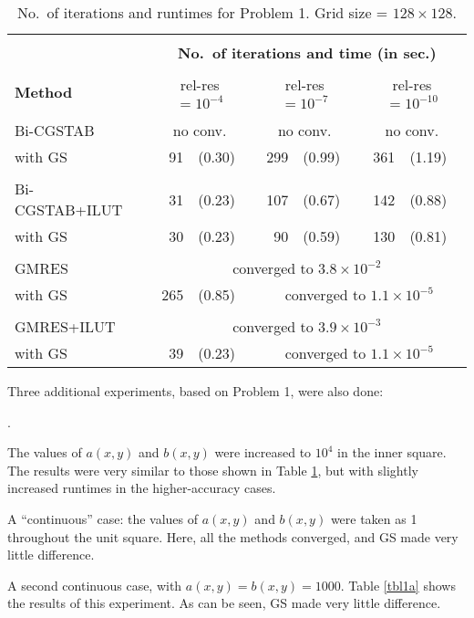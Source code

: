 \documentclass[12pt,a4paper]{article}
\newcounter{i}
\newenvironment{enumerat}
{
\setcounter{i}{0}
\begin{list}
{\arabic{i}.}
{
\usecounter{i}
\setlength{\leftmargin}{25pt}
\setlength{\parsep}{0pt}
\setlength{\itemsep}{0pt}
\setlength{\topsep}{\parskip}
\setlength{\parskip}{0pt}
\setlength{\baselineskip}{14pt}
\setlength{\labelsep}{5pt}
\setlength{\itemindent}{0pt}
}
}
{\end{list}}
\def\be{\begin{enumerat}}
\def\ee{\end{enumerat}}
\def\time{\!\times\!}
\def\noconv{\multicolumn{2}{|c|}{no conv.}}
\begin{document}
\begin{table}[!h]
\def\noconv{\multicolumn{2}{|c|}{no conv.}}
\centering
\begin{tabular}{|l|rl|rl|rl|}
\hline
&\multicolumn{6}{|c|}{}\\[-12pt]
&\multicolumn{6}{|c|}{\bf No.\ of iterations and time (in sec.)}\\
\hline &&&&&&\\[-11pt]
{\bf Method} & \multicolumn{2}{|c|}{rel-res $=\!10^{-4}$}
& \multicolumn{2}{|c|}{rel-res $=\!10^{-7}$}
& \multicolumn{2}{|c|}{rel-res $=\!10^{-10}$} \\
\hline &&&&&&\\[-12pt]
Bi-CGSTAB       & \noconv       & \noconv       & \noconv       \\
with GS         & 91 & (0.30)   & 299 & (0.99)  & 361 & (1.19)  \\
\hline &&&&&&\\[-12pt]
Bi-CGSTAB+ILUT  & 31 & (0.23)   & 107 & (0.67)  & 142 & (0.88)  \\
with GS         & 30 & (0.23)   & 90 & (0.59)   & 130 & (0.81)  \\
\hline 
&\multicolumn{6}{|c|}{}\\[-12pt]
GMRES & \multicolumn{6}{|c|}{converged to $3.8\time 10^{-2}$} \\
with GS & 265 & (0.85) &
\multicolumn{4}{|c|}{converged to $1.1\time 10^{-5}$} \\
\hline 
&\multicolumn{6}{|c|}{}\\[-12pt]
GMRES+ILUT & \multicolumn{6}{|c|}{converged to $3.9\time 10^{-3}$} \\
with GS & 39 & (0.23) &
\multicolumn{4}{|c|}{converged to $1.1\time 10^{-5}$} \\
\hline
\end{tabular}
\caption{No.\ of iterations and runtimes for Problem 1.
         Grid size = $128\time 128$.}
\label{tbl1}
\end{table}

Three additional experiments, based on Problem 1, were also done:
\be
\item The values of $a(x,y)$ and $b(x,y)$ were increased to $10^4$ 
in the inner square.  The results were very similar to those shown
in Table \ref{tbl1}, but with slightly increased runtimes in the
higher-accuracy cases.
\item A ``continuous'' case: the values of $a(x,y)$ and $b(x,y)$ were 
taken as 1 throughout the unit square.  Here, all the methods converged, 
and GS made very little difference.
\item A second continuous case, with $a(x,y)=b(x,y)=1000$.  Table 
\ref{tbl1a} shows the results of this experiment.  As can be seen, 
GS made very little difference.
\ee
\end{document}
